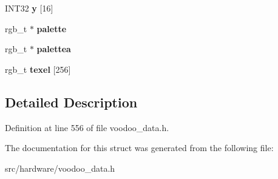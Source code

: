 \begin{DoxyCompactItemize}
\item 
\hypertarget{struct__ncc__table_a5425d681052597a7560a2b29d8adbf89}{I\-N\-T32 {\bfseries y} \mbox{[}16\mbox{]}}\label{struct__ncc__table_a5425d681052597a7560a2b29d8adbf89}

\item 
\hypertarget{struct__ncc__table_a6b6f14d4928d745162c3642b957fc252}{rgb\-\_\-t $\ast$ {\bfseries palette}}\label{struct__ncc__table_a6b6f14d4928d745162c3642b957fc252}

\item 
\hypertarget{struct__ncc__table_a86323735621b1c4f700bb2bd533b04e4}{rgb\-\_\-t $\ast$ {\bfseries palettea}}\label{struct__ncc__table_a86323735621b1c4f700bb2bd533b04e4}

\item 
\hypertarget{struct__ncc__table_af09b7338fd237526e17f0d5065d354a9}{rgb\-\_\-t {\bfseries texel} \mbox{[}256\mbox{]}}\label{struct__ncc__table_af09b7338fd237526e17f0d5065d354a9}

\end{DoxyCompactItemize}


\subsection{Detailed Description}


Definition at line 556 of file voodoo\-\_\-data.\-h.



The documentation for this struct was generated from the following file\-:\begin{DoxyCompactItemize}
\item 
src/hardware/voodoo\-\_\-data.\-h\end{DoxyCompactItemize}
